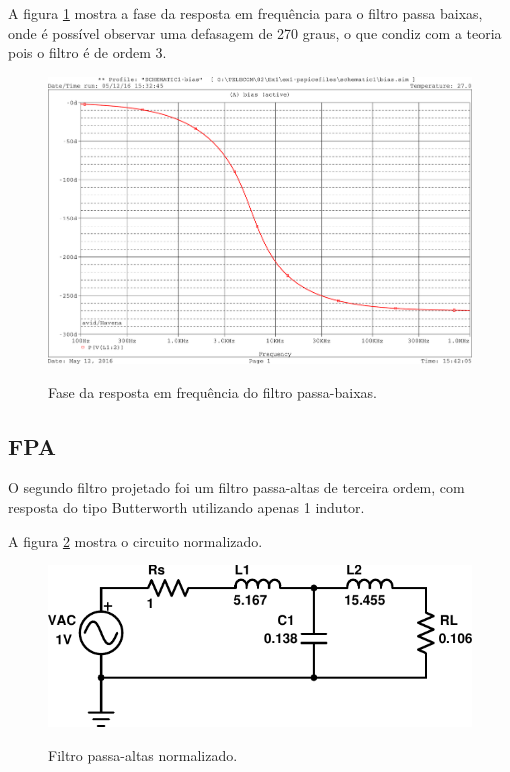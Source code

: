 A figura \ref{fig:resp_freq_phase} mostra a fase da resposta em frequência para 
o filtro passa baixas, onde é possível observar uma defasagem de 270 graus, o 
que condiz com a teoria pois o filtro é de ordem 3.

\begin{figure}[!h]
  \centering
  
  \includegraphics[scale=0.3]{Imagens/resp_freq_phase}
  \label{fig:resp_freq_phase}
  \caption{Fase da resposta em frequência do filtro passa-baixas.}
\end{figure}

\subsection{FPA}
O segundo filtro projetado foi um filtro passa-altas de terceira ordem, com 
resposta do tipo Butterworth utilizando apenas 1 indutor.

A figura \ref{fig:fpa-norm} mostra o circuito normalizado.
\begin{figure}[!h]
  \centering
  
  \includegraphics[scale=0.4]{Imagens/fpa-norm}
  \label{fig:fpa-norm}
  \caption{Filtro passa-altas normalizado.}
\end{figure}

